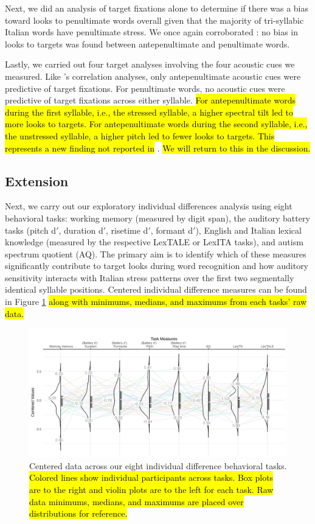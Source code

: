Next, we did an analysis of target fixations alone to determine if there was a bias toward looks to penultimate words overall given that the majority of tri-syllabic Italian words have penultimate stress. We once again corroborated \cite{Sulpizio_McQueen_2012}: no bias in looks to targets was found between antepenultimate and penultimate words.

Lastly, we carried out four target analyses involving the four acoustic cues we measured. Like \cite{Sulpizio_McQueen_2012}'s correlation analyses, only antepenultimate acoustic cues were predictive of target fixations. For penultimate words, no acoustic cues were predictive of target fixations across either syllable. \hl{For antepenultimate words during the first syllable, i.e., the stressed syllable, a higher spectral tilt led to more looks to targets. For antepenultimate words during the second syllable, i.e., the unstressed syllable, a higher pitch led to fewer looks to targets. This represents a new finding not reported in} \cite{Sulpizio_McQueen_2012}. \hl{We will return to this in the discussion.}

\subsection{Extension}

Next, we carry out our exploratory individual differences analysis using eight behavioral tasks: working memory (measured by digit span), the auditory battery tasks (pitch d$'$, duration d$'$, risetime d$'$, formant d$'$), English and Italian lexical knowledge (measured by the respective LexTALE or LexITA tasks), and autism spectrum quotient (AQ). The primary aim is to identify which of these measures significantly contribute to target looks during word recognition and how auditory sensitivity interacts with Italian stress patterns over the first two segmentally identical syllable positions. Centered individual difference measures can be found in Figure \ref{fig:plot_raw_task} \hl{along with minimums, medians, and maximums from each tasks' raw data.}

\begin{figure}[H]
  \centering
  \includegraphics[width=1\linewidth]{visuals/plot_raw_task.jpeg}
  \caption{Centered data across our eight individual difference behavioral tasks. \hl{Colored lines show individual participants across tasks. Box plots are to the right and violin plots are to the left for each task. Raw data minimums, medians, and maximums are placed over distributions  for reference.}}
  \label{fig:plot_raw_task}
\end{figure}


